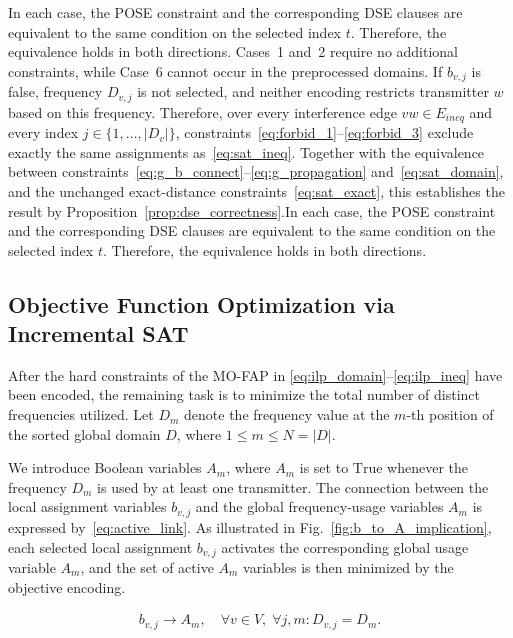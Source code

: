 \begin{IEEEproof}
In each case, the POSE constraint and the corresponding DSE clauses are equivalent to the same condition on the selected index $t$. Therefore, the equivalence holds in both directions.
Cases~1 and~2 require no additional constraints, while Case~6 cannot occur in the preprocessed domains. If $b_{v,j}$ is false, frequency $D_{v,j}$ is not selected, and neither encoding restricts transmitter $w$ based on this frequency. Therefore, over every interference edge $vw\in E_{ineq}$ and every index $j\in\{1,\ldots,|D_v|\}$, constraints~\eqref{eq:forbid_1}--\eqref{eq:forbid_3} exclude exactly the same assignments as~\eqref{eq:sat_ineq}. Together with the equivalence between constraints~\eqref{eq:g_b_connect}--\eqref{eq:g_propagation} and~\eqref{eq:sat_domain}, and the unchanged exact-distance constraints~\eqref{eq:sat_exact}, this establishes the result by Proposition~\ref{prop:dse_correctness}.In each case, the POSE constraint and the corresponding DSE clauses are equivalent to the same condition on the selected index $t$. Therefore, the equivalence holds in both directions.
\end{IEEEproof}

\subsection{Objective Function Optimization via Incremental SAT}
\label{subsec:incremental_sat}
After the hard constraints of the MO-FAP in \eqref{eq:ilp_domain}--\eqref{eq:ilp_ineq} have been encoded, the remaining task is to minimize the total number of distinct frequencies utilized. Let $D_m$ denote the frequency value at the $m$-th position of the sorted global domain $D$, where $1 \le m \le N=|D|$.

We introduce Boolean variables $A_m$, where $A_m$ is set to $\text{True}$ whenever the frequency $D_m$ is used by at least one transmitter.
The connection between the local assignment variables $b_{v,j}$ and the global frequency-usage variables $A_m$ is expressed by~\eqref{eq:active_link}.
As illustrated in Fig.~\ref{fig:b_to_A_implication}, each selected local assignment $b_{v,j}$ activates the corresponding global usage variable $A_m$, and the set of active $A_m$ variables is then minimized by the objective encoding.


\begin{align}
    b_{v,j} \rightarrow A_m, \quad \forall v \in V,\; \forall j,m : D_{v,j} = D_m.
    \label{eq:active_link}
\end{align}

